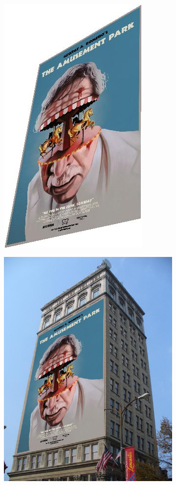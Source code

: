 \documentclass{article}
\begin{document}
\begin{figure}[H]
\begin{subfigure}{.3\textwidth}
        \includegraphics[scale=0.3]{q2/output/transform.jpg}
        \label{fig 1}
    \end{subfigure}
    \begin{subfigure}{.3\textwidth}
        \centering
        \includegraphics[scale=0.3]{q2/output/output.jpg}

\end{subfigure}
\end{figure}
\end{document}
